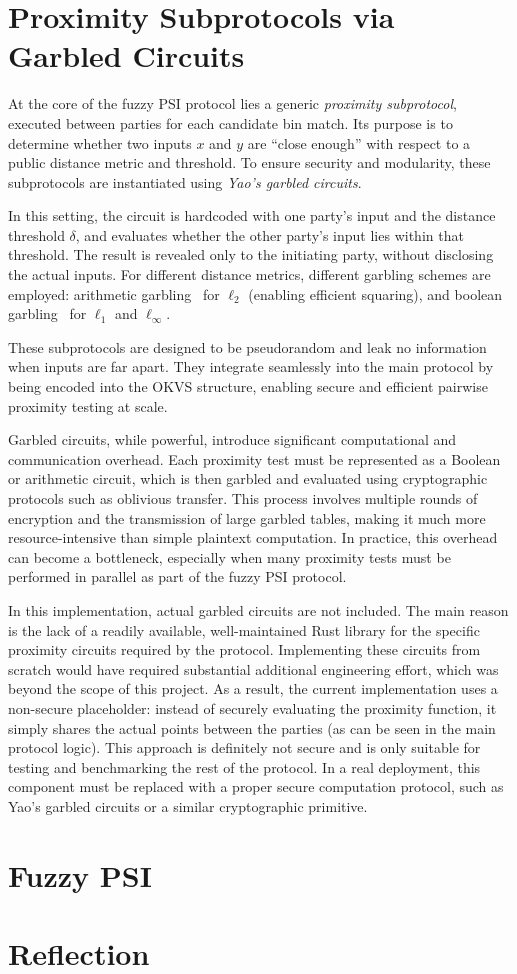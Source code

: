 \section{Proximity Subprotocols via Garbled Circuits}

At the core of the fuzzy PSI protocol lies a generic \emph{proximity subprotocol}, executed between parties for each candidate bin match. Its purpose is to determine whether two inputs $x$ and $y$ are ``close enough'' with respect to a public distance metric and threshold. To ensure security and modularity, these subprotocols are instantiated using \emph{Yao's garbled circuits}.

In this setting, the circuit is hardcoded with one party's input and the distance threshold $\delta$, and evaluates whether the other party's input lies within that threshold. The result is revealed only to the initiating party, without disclosing the actual inputs. For different distance metrics, different garbling schemes are employed: arithmetic garbling~\cite{ballGarblingGadgetsBoolean2016} for $\ell_2$ (enabling efficient squaring), and boolean garbling~\cite{zahurTwoHalvesMake2015} for $\ell_1$ and $\ell_\infty$.

These subprotocols are designed to be pseudorandom and leak no information when inputs are far apart. They integrate seamlessly into the main protocol by being encoded into the OKVS structure, enabling secure and efficient pairwise proximity testing at scale.

Garbled circuits, while powerful, introduce significant computational and communication overhead. Each proximity test must be represented as a Boolean or arithmetic circuit, which is then garbled and evaluated using cryptographic protocols such as oblivious transfer. This process involves multiple rounds of encryption and the transmission of large garbled tables, making it much more resource-intensive than simple plaintext computation. In practice, this overhead can become a bottleneck, especially when many proximity tests must be performed in parallel as part of the fuzzy PSI protocol.

In this implementation, actual garbled circuits are not included. The main reason is the lack of a readily available, well-maintained Rust library for the specific proximity circuits required by the protocol. Implementing these circuits from scratch would have required substantial additional engineering effort, which was beyond the scope of this project. As a result, the current implementation uses a non-secure placeholder: instead of securely evaluating the proximity function, it simply shares the actual points between the parties (as can be seen in the main protocol logic). This approach is definitely not secure and is only suitable for testing and benchmarking the rest of the protocol. In a real deployment, this component must be replaced with a proper secure computation protocol, such as Yao's garbled circuits or a similar cryptographic primitive.

\section{Fuzzy PSI}

\section{Reflection}
